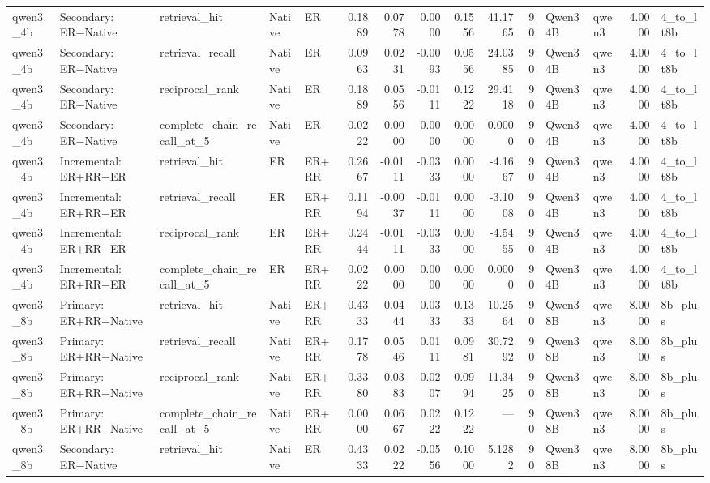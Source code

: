 \begin{tabular}{lllllrrrrrrllrl}
qwen3_4b & Secondary: ER−Native & retrieval_hit & Native & ER & 0.1889 & 0.0778 & 0.0000 & 0.1556 & 41.1765 & 90 & Qwen3 4B & qwen3 & 4.0000 & 4_to_lt8b \\
qwen3_4b & Secondary: ER−Native & retrieval_recall & Native & ER & 0.0963 & 0.0231 & -0.0093 & 0.0556 & 24.0385 & 90 & Qwen3 4B & qwen3 & 4.0000 & 4_to_lt8b \\
qwen3_4b & Secondary: ER−Native & reciprocal_rank & Native & ER & 0.1889 & 0.0556 & -0.0111 & 0.1222 & 29.4118 & 90 & Qwen3 4B & qwen3 & 4.0000 & 4_to_lt8b \\
qwen3_4b & Secondary: ER−Native & complete_chain_recall_at_5 & Native & ER & 0.0222 & 0.0000 & 0.0000 & 0.0000 & 0.0000 & 90 & Qwen3 4B & qwen3 & 4.0000 & 4_to_lt8b \\
qwen3_4b & Incremental: ER+RR−ER & retrieval_hit & ER & ER+RR & 0.2667 & -0.0111 & -0.0333 & 0.0000 & -4.1667 & 90 & Qwen3 4B & qwen3 & 4.0000 & 4_to_lt8b \\
qwen3_4b & Incremental: ER+RR−ER & retrieval_recall & ER & ER+RR & 0.1194 & -0.0037 & -0.0111 & 0.0000 & -3.1008 & 90 & Qwen3 4B & qwen3 & 4.0000 & 4_to_lt8b \\
qwen3_4b & Incremental: ER+RR−ER & reciprocal_rank & ER & ER+RR & 0.2444 & -0.0111 & -0.0333 & 0.0000 & -4.5455 & 90 & Qwen3 4B & qwen3 & 4.0000 & 4_to_lt8b \\
qwen3_4b & Incremental: ER+RR−ER & complete_chain_recall_at_5 & ER & ER+RR & 0.0222 & 0.0000 & 0.0000 & 0.0000 & 0.0000 & 90 & Qwen3 4B & qwen3 & 4.0000 & 4_to_lt8b \\
qwen3_8b & Primary: ER+RR−Native & retrieval_hit & Native & ER+RR & 0.4333 & 0.0444 & -0.0333 & 0.1333 & 10.2564 & 90 & Qwen3 8B & qwen3 & 8.0000 & 8b_plus \\
qwen3_8b & Primary: ER+RR−Native & retrieval_recall & Native & ER+RR & 0.1778 & 0.0546 & 0.0111 & 0.0981 & 30.7292 & 90 & Qwen3 8B & qwen3 & 8.0000 & 8b_plus \\
qwen3_8b & Primary: ER+RR−Native & reciprocal_rank & Native & ER+RR & 0.3380 & 0.0383 & -0.0207 & 0.0994 & 11.3425 & 90 & Qwen3 8B & qwen3 & 8.0000 & 8b_plus \\
qwen3_8b & Primary: ER+RR−Native & complete_chain_recall_at_5 & Native & ER+RR & 0.0000 & 0.0667 & 0.0222 & 0.1222 & — & 90 & Qwen3 8B & qwen3 & 8.0000 & 8b_plus \\
qwen3_8b & Secondary: ER−Native & retrieval_hit & Native & ER & 0.4333 & 0.0222 & -0.0556 & 0.1000 & 5.1282 & 90 & Qwen3 8B & qwen3 & 8.0000 & 8b_plus \\

\end{tabular}
